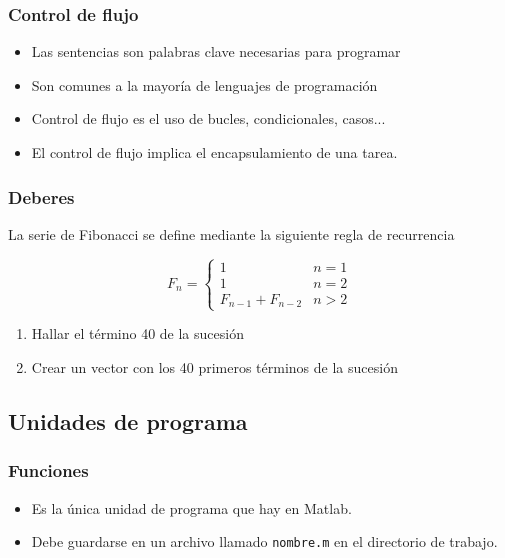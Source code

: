 \documentclass[12pt]{beamer}
\begin{document}
\begin{frame}
\frametitle{Control de flujo}
\begin{itemize}
\item Las sentencias son palabras clave necesarias para programar
\item Son comunes a la mayoría de lenguajes de programación
\item Control de flujo es el uso de bucles, condicionales, casos...
\item El control de flujo implica el encapsulamiento de una tarea.
\end{itemize}
\end{frame}

\begin{frame}
  \frametitle{Deberes}
  La serie de Fibonacci se define mediante la siguiente regla de
  recurrencia

  \[
  F_{n}=\left\{ \begin{array}{cc}
      1 & n=1\\
      1 & n=2\\
      F_{n-1}+F_{n-2} & n>2\end{array}\right.\]
  
  \begin{enumerate}
  \item Hallar el término 40 de la sucesión
  \item Crear un vector con los 40 primeros términos de la sucesión
  \end{enumerate}
\end{frame}

\subsection{Unidades de programa}

\begin{frame}
  \frametitle{Funciones}
  \begin{itemize}
  \item Es la única unidad de programa que hay en Matlab.
  \item Debe guardarse en un archivo llamado \texttt{nombre.m} en el
    directorio de trabajo.
  \end{itemize}

  \testcode
\end{frame}
\end{document}

